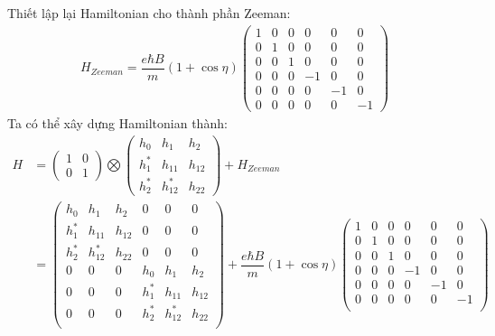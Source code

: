 \documentclass{report}
\newcommand{\f}[2]{\dfrac{#1}{#2}}
\begin{document}
Thiết lập lại Hamiltonian cho thành phần Zeeman:
\begin{align*}
	H_{Zeeman} = \f{e\hbar B}{m}(1+\cos\eta)
	\begin{pmatrix}
		1 & 0 & 0 & 0  & 0  & 0  \\
		0 & 1 & 0 & 0  & 0  & 0  \\
		0 & 0 & 1 & 0  & 0  & 0  \\
		0 & 0 & 0 & -1 & 0  & 0  \\
		0 & 0 & 0 & 0  & -1 & 0  \\
		0 & 0 & 0 & 0  & 0  & -1
	\end{pmatrix}
\end{align*}
Ta có thể xây dựng Hamiltonian thành:
\begin{align}
	H & =
	\begin{pmatrix}
		1 & 0 \\
		0 & 1
	\end{pmatrix}\bigotimes
	\begin{pmatrix}
		h_0   & h_1      & h_2    \\
		h_1^* & h_{11}   & h_{12} \\
		h_2^* & h_{12}^* & h_{22}
	\end{pmatrix}
	+
	H_{Zeeman}
	\nonumber \\
	  & =
	\begin{pmatrix}
		h_0   & h_1      & h_2    & 0       & 0        & 0      \\
		h_1^* & h_{11}   & h_{12} & 0       & 0        & 0      \\
		h_2^* & h_{12}^* & h_{22} & 0       & 0        & 0      \\
		0     & 0        & 0      & h_{0}   & h_1      & h_{2}  \\
		0     & 0        & 0      & h_1^*   & h_{11}   & h_{12} \\
		0     & 0        & 0      & h_{2}^* & h_{12}^* & h_{22} \\
	\end{pmatrix}
	+
	\f{e\hbar B}{m}(1+\cos\eta)
	\begin{pmatrix}
		1 & 0 & 0 & 0  & 0  & 0  \\
		0 & 1 & 0 & 0  & 0  & 0  \\
		0 & 0 & 1 & 0  & 0  & 0  \\
		0 & 0 & 0 & -1 & 0  & 0  \\
		0 & 0 & 0 & 0  & -1 & 0  \\
		0 & 0 & 0 & 0  & 0  & -1 \\
	\end{pmatrix} \nonumber
\end{align}
\end{document}
